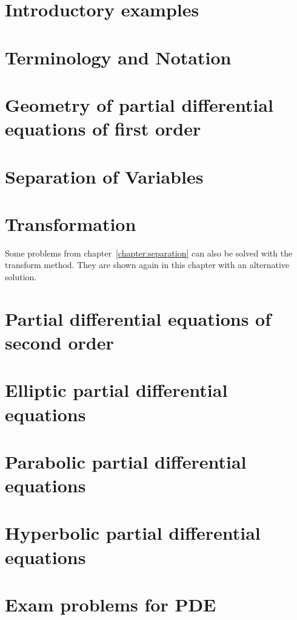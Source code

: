 \documentclass[a4paper,12pt]{book}
\begin{document}

\mainmatter


\chapter{Introductory examples}

\chapter{Terminology and Notation}

\chapter{Geometry of partial differential equations of first order
\label{chapter:separation}}

\chapter{Separation of Variables\label{chapter:separation}}

\chapter{Transformation}
Some problems from chapter~\ref{chapter:separation}
can also be solved with the transform method.
They are shown again in this chapter with an alternative solution.
\bigskip


\chapter{Partial differential equations of second order}

\chapter{Elliptic partial differential equations}

\chapter{Parabolic partial differential equations}

\chapter{Hyperbolic partial differential equations}

%
\setcounter{chapter}{0}
\renewcommand\thechapter{\Alph{chapter}}
\chapter{Exam problems for PDE}

\end{document}
